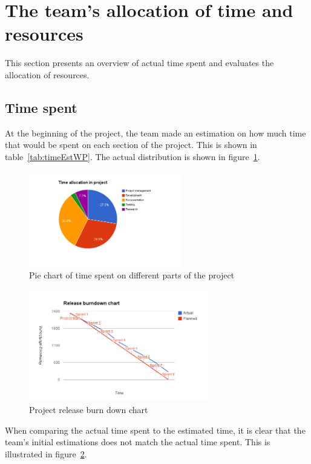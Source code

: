 \section{The team's allocation of time and resources}
\label{sec:timeSpent}
This section presents an overview of actual time spent and evaluates the allocation of resources.

\subsection{Time spent}
At the beginning of the project, the team made an estimation on how much time that would be spent on each section of the project. This is shown in table~\ref{tab:timeEstWP}. The actual distribution is shown in figure~\ref{fig:piechart}.

\begin{figure}[H]
\centering
\includegraphics[width=0.6\textwidth, clip, trim=4cm 2cm 4cm 1cm]{ch/retrospect/fig/timePie.png}
\caption{Pie chart of time spent on different parts of the project}
\label{fig:piechart}
\end{figure}

\begin{figure}[H]
\centering
\includegraphics[width=0.7\textwidth, clip, trim=1.1cm 0.5cm 1.2cm 1cm]{ch/retrospect/fig/release.png}
\caption{Project release burn down chart}
\label{fig:release}
\end{figure}

When comparing the actual time spent to the estimated time, it is clear that the team's initial estimations does not match the actual time spent. This is illustrated in figure~\ref{fig:release}.

